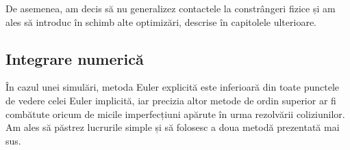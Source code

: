 \documentclass[12pt,a4paper]{report}
\newcommand{\worktype}[1]{[\textit{#1}] }
\newcommand{\dezvoltare}{\worktype{Dezvoltare de produs}}
\newcommand{\cercetare}{\worktype{Cercetare}}
\newcommand{\ambele}{\worktype{Ambele}}
\begin{document}
De asemenea, am decis să nu generalizez contactele la constrângeri fizice și am ales să introduc în schimb alte optimizări, descrise în capitolele ulterioare.

\subsection{Integrare numerică}

În cazul unei simulări, metoda Euler explicită este inferioară din toate punctele de vedere celei Euler implicită, iar precizia altor metode de ordin superior ar fi combătute oricum de micile imperfecțiuni apărute în urma rezolvării coliziunilor. Am ales să păstrez lucrurile simple și să folosesc a doua metodă prezentată mai sus.
% 
%
%
%
%
\end{document}
